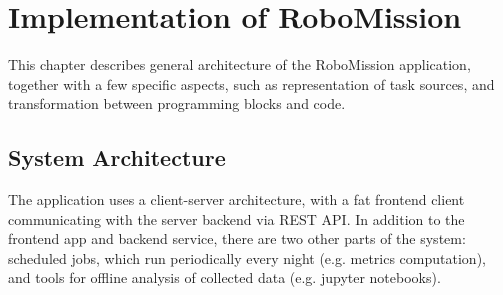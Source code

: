 \chapter{Implementation of RoboMission}
\label{chap:implementation-of-robomission}

This chapter describes general architecture of the RoboMission application,
together with a few specific aspects, such as representation of task sources,
and transformation between programming blocks and code.

\section{System Architecture}

The application uses a client-server architecture,
with a fat frontend client communicating with the server backend via REST API.
In addition to the frontend app and backend service,
there are two other parts of the system:
scheduled jobs, which run periodically every night (e.g. metrics computation),
and tools for offline analysis of collected data
(e.g. jupyter notebooks). %

